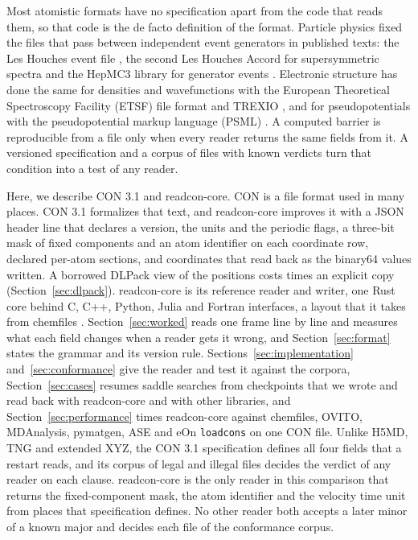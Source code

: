\documentclass[preprint,12pt]{elsarticle}
\begin{document}
Most atomistic formats have no specification apart from the code that
reads them, so that code is the de facto definition of the format.
Particle physics fixed the files that pass between independent event
generators in published texts: the Les Houches event file
\cite{Alwall2007LHEF}, the second Les Houches Accord for supersymmetric
spectra \cite{Allanach2009SLHA2} and the HepMC3 library for generator
events \cite{Buckley2021HepMC3}.
Electronic structure has done the same for densities and wavefunctions
with the European Theoretical Spectroscopy Facility (ETSF) file format
\cite{Gonze2008ETSF} and TREXIO \cite{posenitskiyTrexioFileFormat2023},
and for pseudopotentials with the pseudopotential markup language (PSML)
\cite{Garcia2018PSML}.
A computed barrier is reproducible from a file only when every reader
returns the same fields from it.
A versioned specification and a corpus of files with known verdicts turn
that condition into a test of any reader.

Here, we describe CON 3.1 and readcon-core.
CON is a file format used in many places.
CON 3.1 formalizes that text, and readcon-core improves it with a JSON
header line that declares a version, the units and the periodic flags, a
three-bit mask of fixed components and an atom identifier on each
coordinate row, declared per-atom sections, and coordinates that read
back as the binary64 values written.
A borrowed DLPack view of the positions costs \dlpackRatio{} times an
explicit copy (Section~\ref{sec:dlpack}).
readcon-core is its reference reader and writer, one Rust core behind C,
C++, Python, Julia and Fortran interfaces, a layout that it takes from
chemfiles \cite{frauxChemfileschemfilesVersion01042023}.
Section~\ref{sec:worked} reads one frame line by line and measures what
each field changes when a reader gets it wrong, and
Section~\ref{sec:format} states the grammar and its version rule.
Sections~\ref{sec:implementation} and~\ref{sec:conformance} give the
reader and test it against the corpora, Section~\ref{sec:cases} resumes
saddle searches from checkpoints that we wrote and read back with
readcon-core and with other libraries, and Section~\ref{sec:performance}
times readcon-core against chemfiles, OVITO, MDAnalysis, pymatgen, ASE
and eOn \texttt{loadcons} on one CON file.
Unlike H5MD, TNG and extended XYZ, the CON 3.1 specification defines all
four fields that a restart reads, and its corpus of legal and illegal
files decides the verdict of any reader on each clause.
readcon-core is the only reader in this comparison that returns the
fixed-component mask, the atom identifier and the velocity time unit
from places that specification defines.
No other reader both accepts a later minor of a known major and decides
each file of the conformance corpus.
\end{document}
